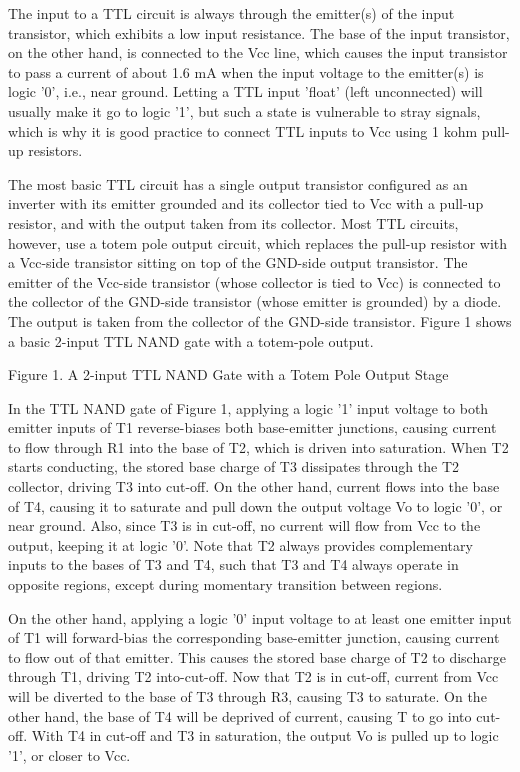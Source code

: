 The input to a TTL circuit is always through the emitter(s) of the input transistor, which exhibits a low input resistance.  The base of the input transistor, on the other hand, is connected to the Vcc line, which causes the input transistor to pass a current of about 1.6 mA when the input voltage to the emitter(s) is logic '0', i.e., near ground. Letting a TTL input 'float' (left unconnected) will usually make it go to logic '1', but such a state is vulnerable to stray signals, which is why it is good practice to connect TTL inputs to Vcc using 1 kohm pull-up resistors.



The most basic TTL circuit has a single output transistor configured as an inverter with its emitter grounded and its collector tied to Vcc with a pull-up resistor, and with the output taken from its collector. Most TTL circuits, however, use a totem pole output circuit, which replaces the pull-up resistor with a Vcc-side transistor sitting on top of the GND-side output transistor. The emitter of the Vcc-side transistor (whose collector is tied to Vcc) is connected to the collector of the GND-side transistor (whose emitter is grounded) by a diode.  The output is taken from the collector of the GND-side transistor. Figure 1 shows a basic 2-input TTL NAND gate with a totem-pole output.







Figure 1.  A 2-input TTL NAND Gate with a Totem Pole Output Stage





In the TTL NAND gate of Figure 1, applying a logic '1' input voltage to both emitter inputs of T1 reverse-biases both base-emitter junctions, causing current to flow through R1 into the base of T2, which is driven into saturation. When T2 starts conducting, the stored base charge of T3 dissipates through the T2 collector, driving T3 into cut-off.  On the other hand, current flows into the base of T4, causing it to saturate and pull down the output voltage Vo to logic '0', or near ground.  Also, since T3 is in cut-off, no current will flow from Vcc to the output, keeping it at logic '0'.  Note that T2 always provides complementary inputs to the bases of T3 and T4, such that T3 and T4 always operate in opposite regions, except during momentary transition between regions.


On the other hand, applying a logic '0' input voltage to at least one emitter input of T1 will forward-bias the corresponding base-emitter junction, causing current to flow out of that emitter.  This causes the stored base charge of T2 to discharge through T1, driving T2 into-cut-off.  Now that T2 is in cut-off, current from Vcc will be diverted to the base of T3 through R3, causing T3 to saturate.  On the other hand, the base of T4 will be deprived of current, causing T to go into cut-off.  With T4 in cut-off and T3 in saturation, the output Vo is pulled up to logic '1', or closer to Vcc.




